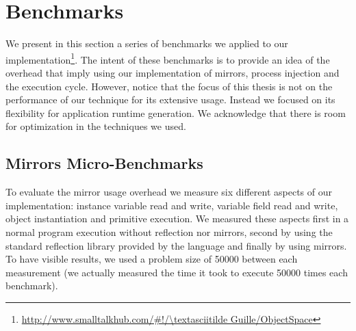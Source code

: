 %

\section{Benchmarks}

We present in this section a series of benchmarks we applied to our implementation\footnote{\url{http://www.smalltalkhub.com/\#!/\textasciitilde Guille/ObjectSpace}}. The intent of these benchmarks is to provide an idea of the overhead that imply using our implementation of mirrors, process injection and the execution cycle. However, notice that the focus of this thesis is not on the performance of our technique for its extensive usage. Instead we focused on its flexibility for application runtime generation. We acknowledge that there is room for optimization in the techniques we used.

\subsection{Mirrors Micro-Benchmarks}

To evaluate the mirror usage overhead we measure six different aspects of our implementation: instance variable read and write, variable field read and write, object instantiation and primitive execution. We measured these aspects first in a normal program execution without reflection nor mirrors, second by using the standard reflection library provided by the language and finally by using mirrors. To have visible results, we used a problem size of 50000 between each measurement (\ie we actually measured the time it took to execute 50000 times each benchmark).

